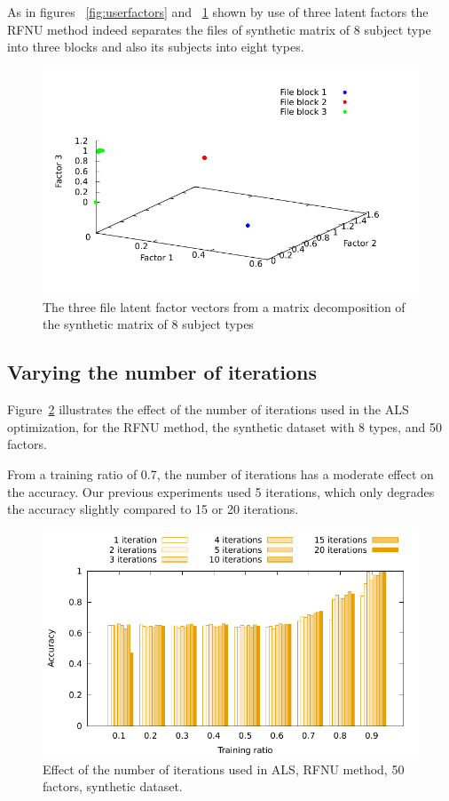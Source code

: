 \documentclass[10pt, conference, compsocconf]{IEEEtran}
\begin{document}
As in figures ~\ref{fig:userfactors} and  ~\ref{fig:itemfactors} shown by use of three latent factors the RFNU method indeed separates the files of synthetic matrix of 8 subject type into three blocks and also its subjects into eight types.

\begin{figure}[h]
\includegraphics[width=0.9\columnwidth]{data/results/latent-factors/5i-3f-ALS-r1-08-itemFactors.pdf}
\caption{The three file latent factor vectors from a matrix decomposition of the synthetic matrix of 8 subject types}
\label{fig:itemfactors}
\end{figure}

\subsection{Varying the number of iterations}
Figure~\ref{fig:iterations} illustrates the effect of the number of 
iterations used in the ALS optimization, for the 
RFNU method, the synthetic dataset with 8 types, and 50 factors. 

From a training ratio of 0.7, the number of iterations has a moderate 
effect on the accuracy. Our previous experiments used 5 iterations, 
which only degrades the accuracy slightly compared to 15 or 20 iterations.

\begin{figure}[h]
\includegraphics[width=0.9\columnwidth]{data/results/means_of_results/ALS/Synthetic/8type-RFNU-Differ-Num-Iterations-rank50/ALS-8-types-iteration.pdf}
\caption{Effect of the number of iterations used in ALS, RFNU method, 50 factors, synthetic dataset.}
\label{fig:iterations}
\end{figure}
\end{document}
